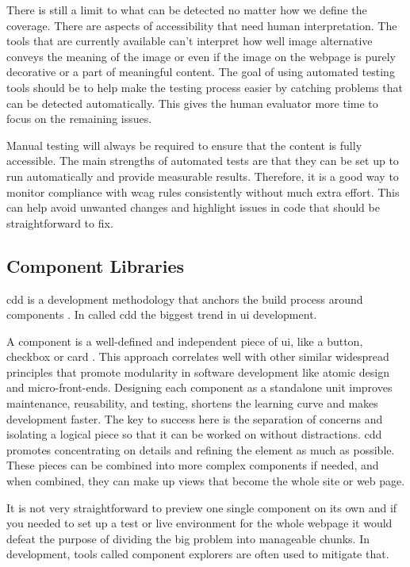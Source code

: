 \documentclass{master_thesis}
\begin{document}
There is still a limit to what can be detected no matter how we define the coverage. There are aspects of accessibility that need human interpretation. The tools that are currently available can't interpret how well image alternative conveys the meaning of the image or even if the image on the webpage is purely decorative or a part of meaningful content. The goal of using automated testing tools should be to help make the testing process easier by catching problems that can be detected automatically. This gives the human evaluator more time to focus on the remaining issues.

Manual testing will always be required to ensure that the content is fully accessible. The main strengths of automated tests are that they can be set up to run automatically and provide measurable results. Therefore, it is a good way to monitor compliance with \ac{wcag} rules consistently without much extra effort. This can help avoid unwanted changes and highlight issues in code that should be straightforward to fix.

\subsection{Component Libraries}


\ac{cdd} is a development methodology that anchors the build process around components \citep{Coleman2017}. In \citeyear{Coleman2017} \citeauthor{Coleman2017} called \ac{cdd} the biggest trend in \ac{ui} development.

A component is a well-defined and independent piece of \ac{ui}, like a button, checkbox or card \citep{Ella2019}. This approach correlates well with other similar widespread principles that promote modularity in software development like atomic design and micro-front-ends. Designing each component as a standalone unit improves maintenance, reusability, and testing, shortens the learning curve and makes development faster. The key to success here is the separation of concerns and isolating a logical piece so that it can be worked on without distractions. \ac{cdd} promotes concentrating on details and refining the element as much as possible. These pieces can be combined into more complex components if needed, and when combined, they can make up views that become the whole site or web page.

It is not very straightforward to preview one single component on its own and if you needed to set up a test or live environment for the whole webpage it would defeat the purpose of dividing the big problem into manageable chunks. In development, tools called component explorers are often used to mitigate that.
\end{document}
